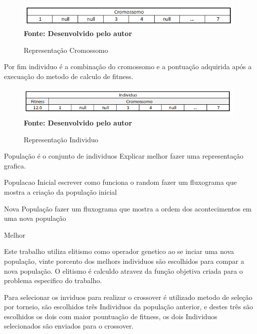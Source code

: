 \documentclass{abntpuc}
\begin{document}
\begin{figure}[!htb]
\caption[Representação Cromossomo]{Representação Cromossomo}
\label{fig:figura6}
\centering
\includegraphics[scale=0.8]{imagens/representacaoCromossomo.png}
\\ \textbf{\footnotesize Fonte: Desenvolvido pelo autor}
\end{figure}

Por fim individuo é a combinação do cromossomo e a pontuação adquirida após a execuação do metodo de calculo de fitness.\par

\begin{figure}[!htb]
\caption[Representação Individuo]{Representação Individuo}
\label{fig:figura7}
\centering
\includegraphics[scale=0.8]{imagens/representacaoIndividuo.png}
\\ \textbf{\footnotesize Fonte: Desenvolvido pelo autor}
\end{figure}


População é o conjunto de individuos Explicar melhor fazer uma representação grafica.\par

Populacao Inicial  escrever como funciona o random fazer um fluxograma que mostra a criação da população inicial\par

Nova População fazer um fluxograma que mostra a ordem dos acontecimentos em uma nova população \par

Melhor


Este trabalho utiliza elitismo como operador genetico ao se inciar uma nova população, vinte porcento dos melhors individuos são escolhidos para compar a nova população. O elitismo é calculdo atravez da função objetiva criada para o problema especifico do trabalho.\par

Para selecionar os inviduos para realizar o crossover é utilizado metodo de seleção por torneio, são escolhidos três Individuos da população anterior, e destes três são escolhidos os dois com maior pountuação de fitness, os dois Individuos selecionados são enviados para o crossover.\par
\end{document}
